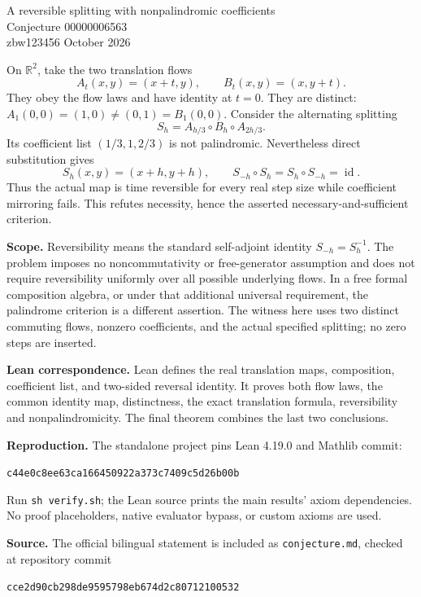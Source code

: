 \documentclass[11pt]{article}
\begin{document}
\begin{center}{\Large A reversible splitting with nonpalindromic coefficients}\\[6pt]
{\large Conjecture 00000006563}\\[5pt]
zbw123456  October 2026\end{center}

On $\mathbb R^2$, take the two translation flows
\[
A_t(x,y)=(x+t,y),\qquad B_t(x,y)=(x,y+t).
\]
They obey the flow laws and have identity at $t=0$. They are distinct:
$A_1(0,0)=(1,0)\ne(0,1)=B_1(0,0)$.
Consider the alternating splitting
\[
S_h=A_{h/3}\circ B_h\circ A_{2h/3}.
\]
Its coefficient list $(1/3,1,2/3)$ is not palindromic.
Nevertheless direct substitution gives
\[
S_h(x,y)=(x+h,y+h),\qquad
S_{-h}\circ S_h=S_h\circ S_{-h}=\operatorname{id}.
\]
Thus the actual map is time reversible for every real step size while
coefficient mirroring fails. This refutes necessity, hence the asserted
necessary-and-sufficient criterion.

\textbf{Scope.} Reversibility means the standard self-adjoint identity
$S_{-h}=S_h^{-1}$. The problem imposes no noncommutativity or free-generator
assumption and does not require reversibility uniformly over all possible
underlying flows. In a free formal composition algebra, or under that
additional universal requirement, the palindrome criterion is a different
assertion. The witness here uses two distinct commuting flows, nonzero
coefficients, and the actual specified splitting; no zero steps are inserted.

\textbf{Lean correspondence.} Lean defines the real translation maps,
composition, coefficient list, and two-sided reversal identity.
It proves both flow laws, the common identity map, distinctness,
the exact translation formula, reversibility and nonpalindromicity.
The final theorem combines the last two conclusions.

\textbf{Reproduction.} The standalone project pins Lean 4.19.0 and Mathlib
commit:
\begin{center}\small\texttt{c44e0c8ee63ca166450922a373c7409c5d26b00b}\end{center}
Run \texttt{sh verify.sh}; the Lean source prints the main results'
axiom dependencies. No proof placeholders, native evaluator bypass, or
custom axioms are used.

\textbf{Source.} The official bilingual statement is included as
\texttt{conjecture.md}, checked at repository commit
\begin{center}\small\texttt{cce2d90cb298de9595798eb674d2c80712100532}\end{center}
\end{document}
